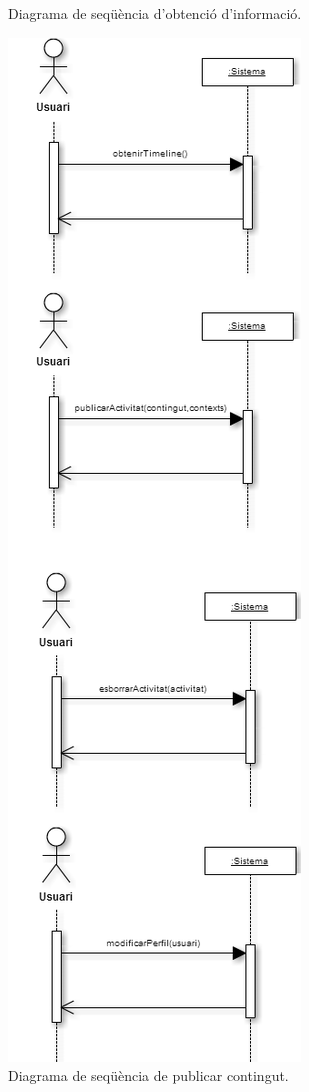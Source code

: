 \begin{figure}[ht]
\begin{minipage}[t]{.48\textwidth}
        \caption{Diagrama de seqüència d'obtenció d'informació.}
        \label{fig:model_conceptual_obtenció}
    \end{minipage}%
    \hfill
    \begin{minipage}[t]{.48\textwidth}
        \centering
        \includegraphics*[scale=0.7,viewport=0 567 322 855]{Memoria/Especificacio/model_comportament.png}
        \caption{Diagrama de seqüència de publicar contingut.}
        \label{fig:model_conceptual_publicar}
    \end{minipage}
\end{figure}

